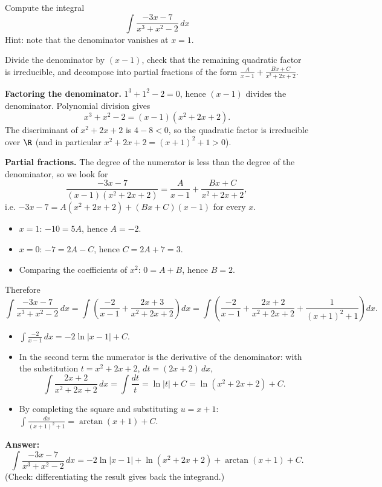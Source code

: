 
\begin{question}
Compute the integral
\[ \int \frac{-3x - 7}{x^3 + x^2 - 2}\,dx \]
Hint: note that the denominator vanishes at $x = 1$.
\end{question}

\begin{hint}
Divide the denominator by $(x - 1)$, check that the remaining quadratic factor is irreducible, and decompose into partial fractions of the form $\frac{A}{x-1} + \frac{Bx + C}{x^2 + 2x + 2}$.
\end{hint}

\begin{solution}
\textbf{Factoring the denominator.} $1^3 + 1^2 - 2 = 0$, hence $(x - 1)$ divides the denominator. Polynomial division gives
\[ x^3 + x^2 - 2 = (x - 1)(x^2 + 2x + 2). \]
The discriminant of $x^2 + 2x + 2$ is $4 - 8 < 0$, so the quadratic factor is irreducible over $\R$ (and in particular $x^2 + 2x + 2 = (x+1)^2 + 1 > 0$).

\textbf{Partial fractions.} The degree of the numerator is less than the degree of the denominator, so we look for
\[ \frac{-3x - 7}{(x - 1)(x^2 + 2x + 2)} = \frac{A}{x - 1} + \frac{Bx + C}{x^2 + 2x + 2}, \]
i.e. $-3x - 7 = A(x^2 + 2x + 2) + (Bx + C)(x - 1)$ for every $x$.
\begin{itemize}
  \item $x = 1$: $-10 = 5A$, hence $A = -2$.
  \item $x = 0$: $-7 = 2A - C$, hence $C = 2A + 7 = 3$.
  \item Comparing the coefficients of $x^2$: $0 = A + B$, hence $B = 2$.
\end{itemize}
Therefore
\[ \int \frac{-3x - 7}{x^3 + x^2 - 2}\,dx = \int \left( \frac{-2}{x - 1} + \frac{2x + 3}{x^2 + 2x + 2} \right) dx
   = \int \left( \frac{-2}{x - 1} + \frac{2x + 2}{x^2 + 2x + 2} + \frac{1}{(x + 1)^2 + 1} \right) dx. \]
\begin{itemize}
  \item $\int \frac{-2}{x - 1}\,dx = -2\ln|x - 1| + C$.
  \item In the second term the numerator is the derivative of the denominator: with the substitution $t = x^2 + 2x + 2$, $dt = (2x + 2)\,dx$,
  \[ \int \frac{2x + 2}{x^2 + 2x + 2}\,dx = \int \frac{dt}{t} = \ln|t| + C = \ln(x^2 + 2x + 2) + C. \]
  \item By completing the square and substituting $u = x + 1$: $\int \frac{dx}{(x + 1)^2 + 1} = \arctan(x + 1) + C$.
\end{itemize}
\textbf{Answer:}
\[ \boxed{\int \frac{-3x - 7}{x^3 + x^2 - 2}\,dx = -2\ln|x - 1| + \ln(x^2 + 2x + 2) + \arctan(x + 1) + C.} \]
(Check: differentiating the result gives back the integrand.)
\end{solution}
